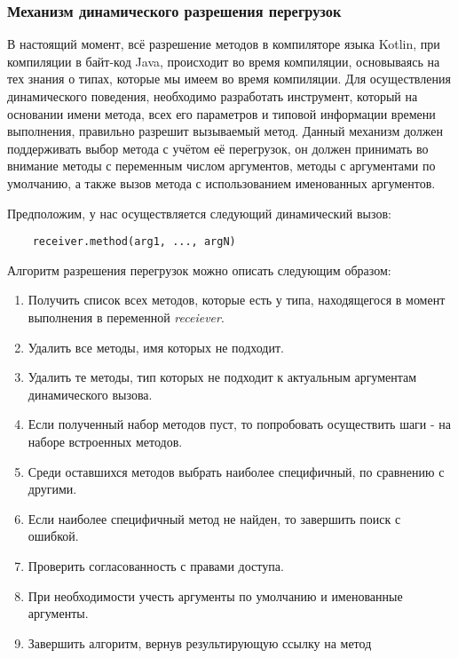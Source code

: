 \subsubsection{Механизм динамического разрешения перегрузок}
\label{realization:dynamicResolve}

В настоящий момент, всё разрешение методов в компиляторе языка Kotlin, при компиляции в байт-код Java, происходит во время компиляции, основываясь на тех знания о типах, которые мы имеем во время компиляции. Для осуществления динамического поведения, необходимо разработать инструмент, который на основании имени метода, всех его параметров и типовой информации времени
выполнения, правильно разрешит вызываемый метод. Данный механизм должен поддерживать выбор метода с учётом её перегрузок, он должен принимать во внимание методы с переменным числом аргументов, методы с аргументами по умолчанию, а также вызов метода с использованием именованных аргументов.

Предположим, у нас осуществляется следующий динамический вызов:

\begin{verbatim}
    receiver.method(arg1, ..., argN)
\end{verbatim}

Алгоритм разрешения перегрузок можно описать следующим образом:

\begin{enumerate}
    \item Получить список всех методов, которые есть у типа, находящегося в момент выполнения в переменной \textit{receiever}.
    \item Удалить все методы, имя которых не подходит.\label{itm:del1}
    \item Удалить те методы, тип которых не подходит к актуальным аргументам динамического вызова.\label{itm:del2}
    \item Если полученный набор методов пуст, то попробовать осуществить шаги \label{itm:del1}-\label{itm:del2} на наборе встроенных методов.
    \item Среди оставшихся методов выбрать наиболее специфичный, по сравнению с другими.
    \item Если наиболее специфичный метод не найден, то завершить поиск с ошибкой.
    \item Проверить согласованность с правами доступа.
    \item При необходимости учесть аргументы по умолчанию и именованные аргументы.
    \item Завершить алгоритм, вернув результирующую ссылку на метод
\end{enumerate}

